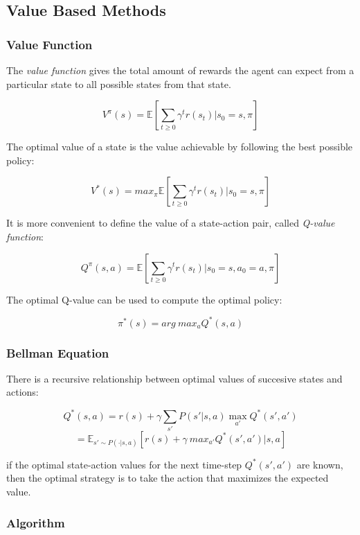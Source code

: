 \documentclass{article}
\begin{document}
\subsection{Value Based Methods}\label{value-based-methods}

\subsubsection{Value Function}\label{value-function}

The \emph{value function} gives the total amount of rewards the agent
can expect from a particular state to all possible states from that
state.

\[V^{\pi}(s)=\mathbb{E}[\sum_{t\ge 0}\gamma^t r(s_t)|s_0 = s, \pi]\]

The optimal value of a state is the value achievable by following the
best possible policy:

\[V^*(s)=max_{\pi}\mathbb{E}[\sum_{t\ge 0}\gamma^t r(s_t)|s_0 = s, \pi]\]

It is more convenient to define the value of a state-action pair, called
\emph{Q-value function}:

\[Q^{\pi}(s, a)= \mathbb{E}[\sum_{t\ge 0}\gamma^t r(s_t)|s_0=s, a_0=a, \pi]\]

The optimal Q-value can be used to compute the optimal policy:

\[\pi^*(s)=arg\ max_aQ^*(s, a)\]

\subsubsection{Bellman Equation}\label{bellman-equation}

There is a recursive relationship between optimal values of succesive
states and actions:

\[Q^*(s, a)=r(s)+\gamma \sum_{s'}P(s'|s, a)\max_{a'}Q^*(s', a')\]
\[=\mathbb{E}_{s'\sim P(\cdot|s, a)}[r(s)+\gamma\ max_{a'}Q^*(s', a')|s, a]\]

if the optimal state-action values for the next time-step
\(Q^*(s', a')\) are known, then the optimal strategy is to take the
action that maximizes the expected value.

\subsubsection{Algorithm}\label{algorithm}
\end{document}
